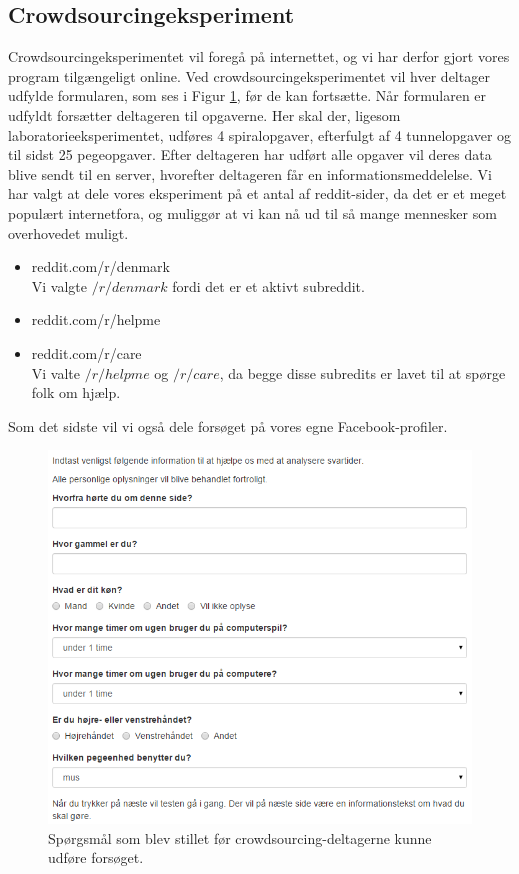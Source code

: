 \subsection*{Crowdsourcingeksperiment}
Crowdsourcingeksperimentet vil foregå på internettet, og vi har derfor gjort vores program tilgængeligt online. Ved crowdsourcingeksperimentet vil hver deltager udfylde formularen, som ses i Figur \ref{fig:Questions}, før de kan fortsætte. Når formularen er udfyldt forsætter deltageren til opgaverne. Her skal der, ligesom laboratorieeksperimentet, udføres 4 spiralopgaver, efterfulgt af 4 tunnelopgaver og til sidst 25 pegeopgaver. Efter deltageren har udført alle opgaver vil deres data blive sendt til en server, hvorefter deltageren får en informationsmeddelelse.
Vi har valgt at dele vores eksperiment på et antal af reddit-sider, da det er et meget populært internetfora, og muliggør at vi kan nå ud til så mange mennesker som overhovedet muligt.
\begin{itemize}
\item reddit.com/r/denmark\\
Vi valgte $/r/denmark$ fordi det er et aktivt subreddit.
\item reddit.com/r/helpme\\
\item reddit.com/r/care\\
Vi valte $/r/helpme$ og $/r/care$, da begge disse subredits er lavet til at spørge folk om hjælp.
\end{itemize}

Som det sidste vil vi også dele forsøget på vores egne Facebook-profiler.
\begin{figure}[h]
\centering
\includegraphics[scale=0.7]{images/screenshots/ex_questions}
\caption{Spørgsmål som blev stillet før crowdsourcing-deltagerne kunne udføre forsøget.}
\label{fig:Questions}
\end{figure}

